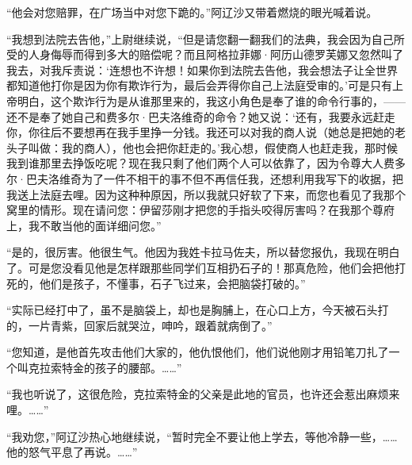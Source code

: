 \par “他会对您赔罪，在广场当中对您下跪的。”阿辽沙又带着燃烧的眼光喊着说。
\par “我想到法院去告他，”上尉继续说，“但是请您翻一翻我们的法典，我会因为自己所受的人身侮辱而得到多大的赔偿呢？而且阿格拉菲娜·阿历山德罗芙娜又忽然叫了我去，对我斥责说：‘连想也不许想！如果你到法院去告他，我会想法子让全世界都知道他打你是因为你有欺诈行为，最后会弄得你自己上法庭受审的。’可是只有上帝明白，这个欺诈行为是从谁那里来的，我这小角色是奉了谁的命令行事的，——还不是奉了她自己和费多尔·巴夫洛维奇的命令？她又说：‘还有，我要永远赶走你，你往后不要想再在我手里挣一分钱。我还可以对我的商人说（她总是把她的老头子叫做：我的商人），他也会把你赶走的。’我心想，假使商人也赶走我，那时候我到谁那里去挣饭吃呢？现在我只剩了他们两个人可以依靠了，因为令尊大人费多尔·巴夫洛维奇为了一件不相干的事不但不再信任我，还想利用我写下的收据，把我送上法庭去哩。因为这种种原因，所以我就只好软了下来，而您也看见了我那个窝里的情形。现在请问您：伊留莎刚才把您的手指头咬得厉害吗？在我那个尊府上，我不敢当他的面详细问您。”
\par “是的，很厉害。他很生气。他因为我姓卡拉马佐夫，所以替您报仇，我现在明白了。可是您没看见他是怎样跟那些同学们互相扔石子的！那真危险，他们会把他打死的，他们是孩子，不懂事，石子飞过来，会把脑袋打破的。”
\par “实际已经打中了，虽不是脑袋上，却也是胸脯上，在心口上方，今天被石头打的，一片青紫，回家后就哭泣，呻吟，跟着就病倒了。”
\par “您知道，是他首先攻击他们大家的，他仇恨他们，他们说他刚才用铅笔刀扎了一个叫克拉索特金的孩子的腰部。……”
\par “我也听说了，这很危险，克拉索特金的父亲是此地的官员，也许还会惹出麻烦来哩。……”
\par “我劝您，”阿辽沙热心地继续说，“暂时完全不要让他上学去，等他冷静一些，……他的怒气平息了再说。……”
